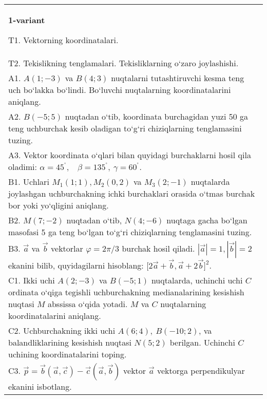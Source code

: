 \documentclass{article}
\begin{document}


\begin{tabular}{m{17cm}}
\textbf{1-variant}
\newline

T1. 
Vektorning koordinatalari.
 \\
T2. 
Tekislikning tenglamalari. Tekisliklarning o‘zaro joylashishi.
 \\
A1. 
$A (1;-3) $ va $B (4;3) $ nuqtalarni tutashtiruvchi
kesma teng uch bo‘lakka bo‘lindi. Bo‘luvchi nuqtalarning koordinatalarini
aniqlang.
 \\
A2. 
$B (-5;5)$ nuqtadan o‘tib, koordinata burchagidan
yuzi 50 ga teng uchburchak kesib oladigan to‘g‘ri chiziqlarning tenglamasini
tuzing.
 \\
A3. 
Vektor koordinata o‘qlari bilan quyidagi burchaklarni hosil qila oladimi:
$\alpha = 45^{{^\circ}},\ \ \ \ \beta = 135^{{^\circ}},\ \gamma = 60^{{^\circ}}$.
 \\
B1. 
Uchlari \(M_{1} (1;1), M_{2} (0,2) \) va
\(M_{3} (2;-1) \) nuqtalarda joylashgan uchburchakning ichki 
burchaklari orasida o‘tmas burchak bor yoki yo‘qligini aniqlang.
 \\
B2. 
\(M (7;-2) \) nuqtadan o‘tib, \(N (4;-6) \) nuqtaga
gacha bo‘lgan masofasi 5 ga teng bo‘lgan to‘g‘ri chiziqlarning tenglamasini tuzing.
 \\
B3. 
$\vec{a}$ va $\vec{b}$ vektorlar $\varphi = 2\pi/3$ burchak hosil qiladi. $|\vec{a}| = 1,|\vec{b}| = 2$ ekanini bilib, quyidagilarni hisoblang:
$\lbrack 2\overrightarrow{a} + \overrightarrow{b},\overrightarrow{a} + 2\overrightarrow{b}\rbrack^{2}$.
 \\
C1. 
Ikki uchi \(A (2; - 3) \) va \(B (-5;1) \) nuqtalarda,
uchinchi uchi $C$ ordinata o‘qiga tegishli uchburchakning
medianalarining kesishish nuqtasi $M$ abssissa o‘qida yotadi.
$M$ va $C$ nuqtalarning koordinatalarini aniqlang.
 \\
C2. 
Uchburchakning ikki uchi \(A (6;4),\ B (- 10;2) \), va
balandliklarining kesishish nuqtasi \(N (5;2) \) berilgan. Uchinchi $C$
uchining koordinatalarini toping.
 \\
C3. 
\(\vec{p} = \vec{b} (\vec{a},\vec{c}) - \vec{c} (\vec{a},\vec{b}) \) vektor \(\vec{a}\) vektorga perpendikulyar ekanini isbotlang.
 \\

\end{tabular}
\vspace{1cm}
\end{document}
